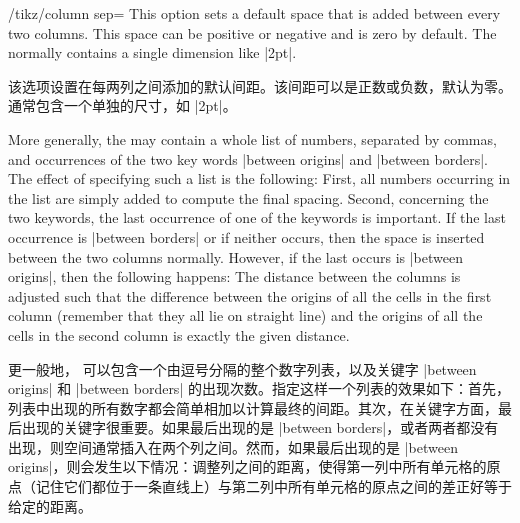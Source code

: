 \begin{key}{/tikz/column sep=}
    This option sets a default space that is added between every two columns.
    This space can be positive or negative and is zero by default. The
     normally contains a single dimension like |2pt|.

    该选项设置在每两列之间添加的默认间距。该间距可以是正数或负数，默认为零。 通常包含一个单独的尺寸，如 |2pt|。
\begin{codeexample}[]
\end{codeexample}
    More generally, the  may contain a whole list of
    numbers, separated by commas, and occurrences of the two key words
    |between origins| and |between borders|. The effect of specifying such a
    list is the following: First, all numbers occurring in the list are simply
    added to compute the final spacing. Second, concerning the two keywords,
    the last occurrence of one of the keywords is important. If the last
    occurrence is |between borders| or if neither occurs, then the space is
    inserted between the two columns normally. However, if the last occurs is
    |between origins|, then the following happens: The distance between the
    columns is adjusted such that the difference between the origins of all the
    cells in the first column (remember that they all lie on straight line) and
    the origins of all the cells in the second column is exactly the given
    distance.

    更一般地， 可以包含一个由逗号分隔的整个数字列表，以及关键字 |between origins| 和 |between borders| 的出现次数。指定这样一个列表的效果如下：首先，列表中出现的所有数字都会简单相加以计算最终的间距。其次，在关键字方面，最后出现的关键字很重要。如果最后出现的是 |between borders|，或者两者都没有出现，则空间通常插入在两个列之间。然而，如果最后出现的是 |between origins|，则会发生以下情况：调整列之间的距离，使得第一列中所有单元格的原点（记住它们都位于一条直线上）与第二列中所有单元格的原点之间的差正好等于给定的距离。


\end{key}
